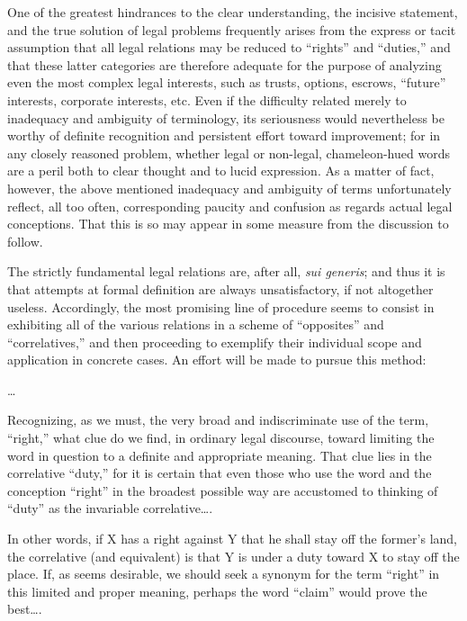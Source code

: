 

One of the greatest hindrances to the clear understanding, the incisive
statement, and the true solution of legal problems frequently arises from the
express or tacit assumption that all legal relations may be reduced to
``rights'' and ``duties,'' and that these latter categories are therefore
adequate for the purpose of analyzing even the most complex legal interests,
such as trusts, options, escrows, ``future'' interests, corporate interests,
etc. Even if the difficulty related merely to inadequacy and ambiguity of
terminology, its seriousness would nevertheless be worthy of definite
recognition and persistent effort toward improvement; for in any closely
reasoned problem, whether legal or non-legal, chameleon-hued words are a peril
both to clear thought and to lucid expression. As a matter of fact, however,
the above mentioned inadequacy and ambiguity of terms unfortunately reflect,
all too often, corresponding paucity and confusion as regards actual legal
conceptions. That this is so may appear in some measure from the discussion to
follow.

The strictly fundamental legal relations are, after all, \textit{sui generis};
and thus it is that attempts at formal definition are always unsatisfactory,
if not altogether useless. Accordingly, the most promising line of procedure
seems to consist in exhibiting all of the various relations in a scheme of
``opposites'' and ``correlatives,'' and then proceeding to exemplify their
individual scope and application in concrete cases. An effort will be made to
pursue this method: 


\ldots

Recognizing, as we must, the very broad and indiscriminate use of the term,
``right,'' what clue do we find, in ordinary legal discourse, toward limiting
the word in question to a definite and appropriate meaning. That clue lies in
the correlative ``duty,'' for it is certain that even those who use the word
and the conception ``right'' in the broadest possible way are accustomed to
thinking of ``duty'' as the invariable correlative\ldots .

In other words, if X has a right against Y that he shall stay off the former's
land, the correlative (and equivalent) is that Y is under a duty
toward X to stay off the place. If, as seems desirable, we should seek a
synonym for the term ``right'' in this limited and proper meaning, perhaps the
word ``claim'' would prove the best\ldots .

